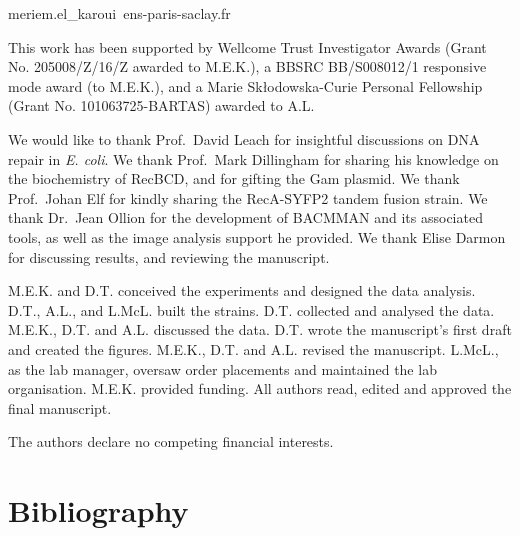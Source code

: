 \documentclass[times, twoside]{zHenriquesLab-StyleBioRxiv}
\begin{document}
\begin{corrauthor}
    meriem.el\_karoui\at\ ens-paris-saclay.fr
\end{corrauthor}









\begin{funding}
    This work has been supported by Wellcome Trust Investigator Awards (Grant No. 205008/Z/16/Z awarded to M.E.K.), a BBSRC BB/S008012/1 responsive mode award (to M.E.K.), and a Marie Skłodowska-Curie Personal Fellowship (Grant No. 101063725-BARTAS) awarded to A.L.
\end{funding}

\begin{acknowledgements}
    We would like to thank Prof.\ David Leach for insightful discussions on DNA repair in \emph{E. coli}. We thank Prof.\ Mark Dillingham for sharing his knowledge on the biochemistry of RecBCD, and for gifting the Gam plasmid. We thank Prof.\ Johan Elf for kindly sharing the RecA-SYFP2 tandem fusion strain. We thank Dr.\ Jean Ollion for the development of BACMMAN and its associated tools, as well as the image analysis support he provided. We thank Elise Darmon for discussing results, and reviewing the manuscript.
\end{acknowledgements}

\begin{contributions}
    M.E.K. and D.T. conceived the experiments and designed the data analysis. D.T., A.L., and L.McL. built the strains. D.T. collected and analysed the data. M.E.K., D.T. and A.L. discussed the data. D.T. wrote the manuscript's first draft and created the figures. M.E.K., D.T. and A.L. revised the manuscript. L.McL., as the lab manager, oversaw order placements and maintained the lab organisation. M.E.K. provided funding. All authors read, edited and approved the final manuscript.
\end{contributions}

\begin{interests}
    The authors declare no competing financial interests.
\end{interests}

\section*{Bibliography}

\end{document}

